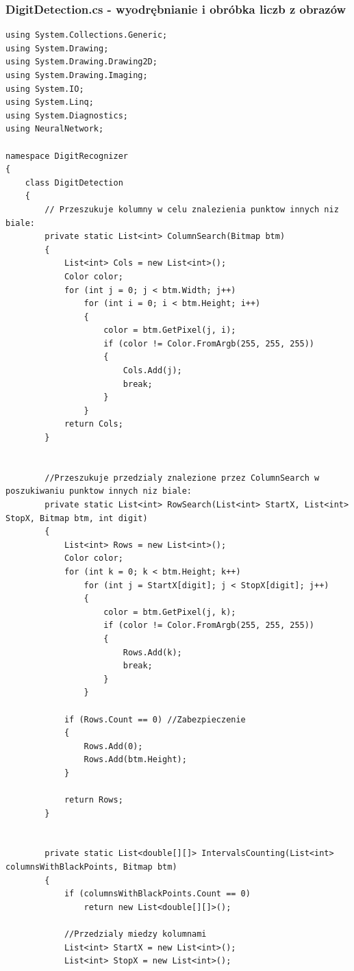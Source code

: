 \documentclass[12pt,a4paper]{article}
\begin{document}
	\subsubsection*{DigitDetection.cs - wyodrębnianie i obróbka liczb z obrazów}
	\begin{lstlisting}
using System.Collections.Generic;
using System.Drawing;
using System.Drawing.Drawing2D;
using System.Drawing.Imaging;
using System.IO;
using System.Linq;
using System.Diagnostics;
using NeuralNetwork;

namespace DigitRecognizer
{
    class DigitDetection
    {
        // Przeszukuje kolumny w celu znalezienia punktow innych niz biale:
        private static List<int> ColumnSearch(Bitmap btm)
        {
            List<int> Cols = new List<int>();
            Color color;
            for (int j = 0; j < btm.Width; j++)
                for (int i = 0; i < btm.Height; i++)
                {
                    color = btm.GetPixel(j, i);
                    if (color != Color.FromArgb(255, 255, 255))
                    {
                        Cols.Add(j);
                        break;
                    }
                }
            return Cols;
        }


        //Przeszukuje przedzialy znalezione przez ColumnSearch w poszukiwaniu punktow innych niz biale:
        private static List<int> RowSearch(List<int> StartX, List<int> StopX, Bitmap btm, int digit)
        {
            List<int> Rows = new List<int>();
            Color color;
            for (int k = 0; k < btm.Height; k++)
                for (int j = StartX[digit]; j < StopX[digit]; j++)
                {
                    color = btm.GetPixel(j, k);
                    if (color != Color.FromArgb(255, 255, 255))
                    {
                        Rows.Add(k);
                        break;
                    }
                }
            
            if (Rows.Count == 0) //Zabezpieczenie
            {
                Rows.Add(0);
                Rows.Add(btm.Height);
            }

            return Rows;
        }


        private static List<double[][]> IntervalsCounting(List<int> columnsWithBlackPoints, Bitmap btm)
        {
            if (columnsWithBlackPoints.Count == 0)
                return new List<double[][]>();

            //Przedzialy miedzy kolumnami
            List<int> StartX = new List<int>();
            List<int> StopX = new List<int>();


\end{lstlisting}
\end{document}
